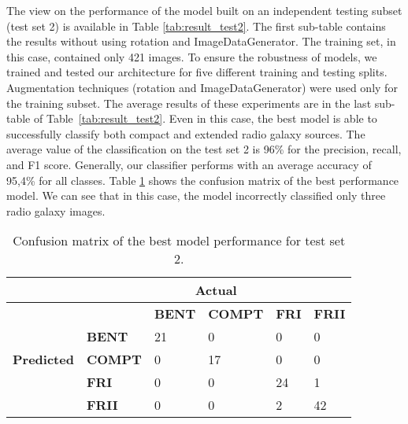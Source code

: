\documentclass[fleqn,usenatbib]{mnras}
\begin{document}
 The view on the performance of the model built on an independent testing subset (test set 2) is available in Table \ref{tab:result_test2}. The first sub-table contains the results without using rotation and ImageDataGenerator. The training set, in this case, contained only 421 images. To ensure the robustness of models, we trained and tested our architecture for five different training and testing splits. Augmentation techniques (rotation and ImageDataGenerator) were used only for the training subset. The average results of these experiments are in the last sub-table of Table~\ref{tab:result_test2}. Even in this case, the best model is able to successfully classify both compact and extended radio galaxy sources. The average value of the classification on the test set 2 is 96\% for the precision, recall, and F1 score. Generally, our classifier performs with an average accuracy of 95,4\% for all classes. Table \ref{tab:cm} shows the confusion matrix of the best performance model. We can see that in this case, the model incorrectly classified only three radio galaxy images. 
 
\begin{table}
    \caption{Confusion matrix of the best model performance for test set 2.}
    \label{tab:cm}
    \centering
    \begin{tabular}{@{}llllll@{}}
        \hline
        \multicolumn{1}{l}{}                                  & \multicolumn{5}{c}{\textbf{Actual}} \\ \hline
        \multicolumn{1}{c|}{\multirow{5}{*}{\textbf{Predicted}}} &              & \textbf{BENT}     & \textbf{COMPT} & \textbf{FRI } & \textbf{FRII} \\
        
        \multicolumn{1}{c|}{}   & \textbf{BENT}  & 21       &    0  &  0  & 0 \\
        \multicolumn{1}{c|}{}   & \textbf{COMPT}  &  0     &   17 & 0  & 0\\
        \multicolumn{1}{c|}{}   &  \textbf{FRI} &  0  &0    &  24 &1\\ 
        \multicolumn{1}{c|}{}   &  \textbf{FRII} &  0 &  0  & 2 & 42  \\\hline
    \end{tabular}
\end{table}
\end{document}
